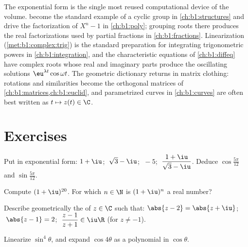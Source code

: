 \begin{remark}\label{rem:b1:complex:whereused}
The exponential form is the single most reused computational device
of the volume.  become the standard example of a
cyclic group in \cref{ch:b1:structures} and drive the factorization
of $X^n - 1$ in \cref{ch:b1:poly}; grouping  roots there
produces the real factorizations used by partial fractions in
\cref{ch:b1:fractions}. Linearization (\cref{met:b1:complex:trig})
is the standard preparation for integrating trigonometric powers in
\cref{ch:b1:integration}, and the characteristic equations of
\cref{ch:b1:diffeq} have complex roots whose real and imaginary
parts produce the oscillating solutions $\eu^{\lambda t}\cos\omega
t$. The geometric dictionary returns in matrix clothing: rotations
and similarities become the orthogonal matrices of
\cref{ch:b1:matrices,ch:b1:euclid}, and parametrized curves in
\cref{ch:b1:curves} are often best written as  $t \mapsto z(t)
\in \C$.
\end{remark}

\section{Exercises}

\begin{exercise}[$\star$]\label{exo:b1:complex:1}
Put in exponential form: $1 + \iu$; $\;\sqrt 3 - \iu$; $\;-5$;
$\;\dfrac{1 + \iu}{\sqrt 3 - \iu}$. Deduce
$\cos\frac{5\pi}{12}$ and $\sin\frac{5\pi}{12}$.
\end{exercise}

\begin{exercise}[$\star$]\label{exo:b1:complex:2}
Compute $(1 + \iu)^{20}$. For which $n \in \N$ is $(1 + \iu)^n$ a
real number?
\end{exercise}

\begin{exercise}[$\star$]\label{exo:b1:complex:3}
Describe geometrically the  of $z \in \C$ such that:
$\abs{z - 2} = \abs{z + \iu}$; $\;\abs{z - 1} = 2$;
$\;\dfrac{z - 1}{z + 1} \in \iu\R$ (for $z \neq -1$).
\end{exercise}

\begin{exercise}[$\star$]\label{exo:b1:complex:4}
Linearize $\sin^4\theta$, and expand $\cos 4\theta$ as a polynomial in
$\cos\theta$.
\end{exercise}

